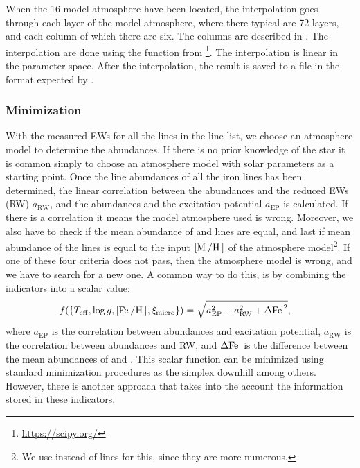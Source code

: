 When the 16 model atmosphere have been located, the interpolation goes through each layer of the
model atmosphere, where there typical are 72 layers, and each column of which there are six. The
columns are described in . The interpolation are done using the
 function from \footnote{\url{https://scipy.org/}}. The interpolation is
linear in the parameter space. After the interpolation, the result is saved to a file in the format
expected by .




\subsubsection{Minimization}
\label{sec:minimization}

With the measured EWs for all the lines in the line list, we choose an atmosphere model to determine
the abundances. If there is no prior knowledge of the star it is common simply to choose an
atmosphere model with solar parameters as a starting point. Once the line abundances of all the iron
lines has been determined, the linear correlation between the abundances and the reduced EWs (RW)
$a_\mathrm{RW}$, and the abundances and the excitation potential $a_\mathrm{EP}$ is calculated. If
there is a correlation it means the model atmosphere used is wrong. Moreover, we also have to check
if the mean abundance of  and  lines are equal, and last if mean abundance of
the  lines is equal to the input $[\ion{M}/\ion{H}]$ of the atmosphere model\footnote{We
use  instead of  lines for this, since they are more numerous.}. If one of
these four criteria does not pass, then the atmosphere model is wrong, and we have to search for a
new one. A common way to do this, is by combining the indicators into a scalar value:
\begin{align}
  f(\{T_\mathrm{eff}, \log g, [\ion{Fe}/\ion{H}], \xi_\mathrm{micro}\}) &= \sqrt{a_\mathrm{EP}^2 + a_\mathrm{RW}^2 + \Delta\ion{Fe}{}^2},
\end{align}
where $a_\mathrm{EP}$ is the correlation between abundances and excitation potential,
$a_\mathrm{RW}$ is the correlation between abundances and RW, and $\Delta\ion{Fe}{}$ is the
difference between the mean abundances of  and . This scalar function can be
minimized using standard minimization procedures as the simplex downhill among others. However,
there is another approach that takes into the account the information stored in these indicators.
